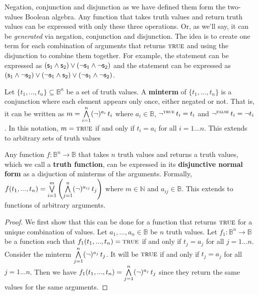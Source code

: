 \documentclass[11pt,letterpaper,fleqn]{memoir} %
\begin{document}
Negation, conjunction and disjunction as we have defined them form the two-values Boolean algebra. Any function that takes truth values and return truth values can be expressed with only these three operations. Or, as we'll say, it can be \emph{generated} via negation, conjunction and disjunction. The idea is to create one term for each combination of arguments that returns $\textsc{true}$ and using the disjunction to combine them together. For example, the statement  can be expressed as $(\mathsf{s}_1 \wedge \mathsf{s}_2) \vee (\neg \mathsf{s}_1 \wedge \neg \mathsf{s}_2)$ and the statement  can be expressed as $(\mathsf{s}_1 \wedge \neg \mathsf{s}_2) \vee (\neg \mathsf{s}_1 \wedge \mathsf{s}_2) \vee (\neg \mathsf{s}_1 \wedge \neg \mathsf{s}_2)$.

\begin{mathSection}
	\begin{defn}\label{def_minterm}
		Let $\{t_1, ..., t_n\} \subseteq \mathbb{B}^n$ be a set of truth values. A \textbf{minterm} of $\{t_1, ..., t_n\}$ is a conjunction where each element appears only once, either negated or not. That is, it can be written as $m = \bigwedge \limits_{i=1}^n (\neg)^{a_{i}} \, t_i$ where $a_{i} \in \mathbb{B}$, $\neg ^ {\textsc{true}} \, t_i = t_i$ and $\neg ^ {\textsc{false}} \, t_i = \neg t_i$. In this notation, $m = \textsc{true}$ if and only if $t_i = a_i$ for all $i=1...n$. This extends to arbitrary sets of truth values
	\end{defn}
	
	\begin{prop}\label{prop_disjunctive_normal_form}
		Any function $f : \mathbb{B}^n \to \mathbb{B}$ that takes $n$ truth values and returns a truth values, which we call a \textbf{truth function}, can be expressed in its \textbf{disjunctive normal form} as a disjuction of minterms of the arguments. Formally, $f(t_1, ..., t_n) =\bigvee \limits_{i=1}^m \left( \bigwedge \limits_{j=1}^n (\neg)^{a_{ij}} \, t_j \right)$ where $m \in \mathbb{N}$ and  $a_{ij} \in \mathbb{B}$. This extends to functions of arbitrary arguments.
	\end{prop}
	\begin{proof}
		We first show that this can be done for a function that returns $\textsc{true}$ for a unique combination of values. Let $a_1, ..., a_n \in \mathbb{B}$ be $n$ truth values. Let $f_1: \mathbb{B}^n \to \mathbb{B}$ be a function such that $f_1(t_1, ..., t_n) = \textsc{true}$ if and only if $t_j = a_j$ for all $j=1...n$. Consider the minterm $\bigwedge \limits_{j=1}^n (\neg)^{a_{j}} \, t_j$. It will be $\textsc{true}$ if and only if $t_j \equal a_j$ for all $j=1...n$. Then we have $f_1(t_1, ..., t_n) = \bigwedge \limits_{j=1}^n (\neg)^{a_{j}} \, t_j$ since they return the same values for the same arguments.
		

\end{proof}
\end{mathSection}
\end{document}
